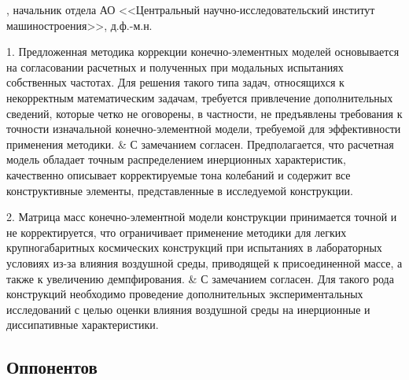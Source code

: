\begin{frame}
	\beginSkip
	, начальник отдела АО <<Центральный научно-исследовательский институт машиностроения>>, д.ф.-м.н.
	\begin{comtblr}{19em}
		1. Предложенная методика коррекции конечно-элементных моделей основывается на согласовании расчетных и полученных при модальных испытаниях собственных частотах. Для решения такого типа задач, относящихся к некорректным математическим задачам, требуется привлечение дополнительных сведений, которые четко не оговорены, в частности, не предъявлены требования к точности изначальной конечно-элементной модели, требуемой для эффективности применения методики.
		&
		С замечанием согласен. Предполагается, что расчетная модель обладает точным распределением инерционных характеристик, качественно описывает корректируемые тона колебаний и содержит все конструктивные элементы, представленные в исследуемой конструкции. \\
	\end{comtblr}
\end{frame}

\begin{frame}
	\beginSkip
	\begin{comtblr}{}
		2. Матрица масс конечно-элементной модели конструкции принимается точной и не корректируется, что ограничивает применение методики для легких крупногабаритных космических конструкций при испытаниях в лабораторных условиях из-за влияния воздушной среды, приводящей к присоединенной массе, а также к увеличению демпфирования. 
		&
		С замечанием согласен. Для такого рода конструкций необходимо проведение дополнительных экспериментальных исследований с целью оценки влияния воздушной среды на инерционные и диссипативные характеристики.
	\end{comtblr}
\end{frame}

\subsection{Оппонентов}

